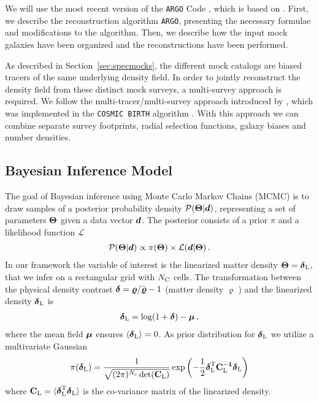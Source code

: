 \documentclass[twocolumn]{aastex63}
\newcommand{\mbi}[1]{\hbox{\boldmath{$#1$}}}
\newcommand{\mat}[1]{\ensuremath{\rm\bf #1}}
\newcommand{\ba}{\begin{eqnarray}}
\newcommand{\ea}{\end{eqnarray}}
\begin{document}
\begin{CJK*}{UTF8}{gbsn}
We will use the most recent version of the \texttt{ARGO} Code \citep{ata:2015,ata:2017}, which is based on \citet{kitaura:2008,jasche:2010,kitaura:2010}.
First, we describe the reconstruction algorithm \texttt{ARGO}, presenting the necessary formulae and modifications to the algorithm. 
Then, we describe how the input mock galaxies have been organized and the reconstructions have been performed. 

As described in Section~\ref{sec:specmocks}, the different mock catalogs are biased tracers of the same underlying density field. In order to jointly reconstruct the density field from these distinct mock surveys, a multi-survey approach is required. We follow the multi-tracer/multi-survey approach introduced by \citet{ata:2021}, which was implemented in the \texttt{COSMIC BIRTH} algorithm \citep{kitaura:2021}.  
With this approach we can combine separate survey footprints, radial selection functions, galaxy biases and number densities.


\subsection{Bayesian Inference Model}

The goal of Bayesian inference using Monte Carlo Markov Chains (MCMC) is to draw samples of a posterior probability density $\mathcal{P}(\mbi{\Theta}|\mbi{d})$, representing a set of parameters $\mbi{\Theta}$ given a data vector $\mbi{d}$. The posterior consists of a prior $\pi$ and a likelihood function $\mathcal{L}$
\ba
\label{eq:bayes}
\cal P(\mbi \Theta|\mbi d)\propto\pi(\mbi \Theta)\times\cal L(\mbi d|\mbi \Theta)\, .
\ea
In our framework the variable of interest is the linearized matter density $\mbi \Theta = \mbi{\delta}_{\rm L}$, that we infer on a rectangular grid with $N_{\rm C}$ cells. The transformation between the physical density contrast $\mbi \delta = \mbi \varrho/\bar{\mbi \varrho}-1$ (matter density $\varrho$ ) and the linearized density $\mbi{\delta}_{\rm L}$ \citep{coles:1991} is 
\ba
\mbi\delta_{\rm L}=\log(1+\mbi\delta)-\mbi\mu\,,
\ea
where the mean field $\mbi \mu$ \citep{kitaura:2012a} ensures $\langle\mbi\delta_{\rm L} \rangle =0 $.
As prior distribution for $\mbi \delta_{\rm L}$ we utilize  a multivariate Gaussian 
\ba
\label{prior}
\pi(\mbi\delta_{\rm L})=\frac{1}{\sqrt{(2\pi)^{N_{c}}\det(\mat C_{\rm L})}}\exp\left(-\frac{1}{2}\mbi \delta^{\rm T}_{\rm L}\mat C_{\rm L}^{-1}\mbi\delta_{\rm L}\right)
\ea
where $\mat C_{\rm L}=\langle\mbi\delta^{\rm T}_{\rm L}\mbi\delta_{\rm L}\rangle$ is the co-variance matrix of the linearized density.


\end{CJK*}
\end{document}
